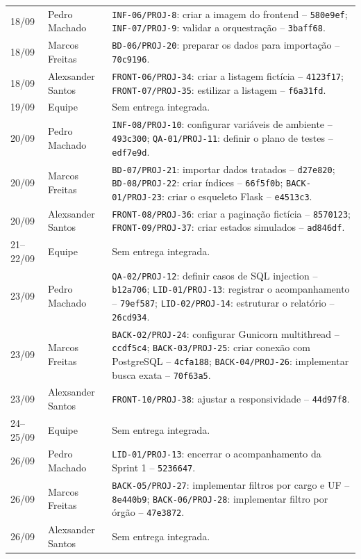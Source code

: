 \documentclass[12pt]{article}
\newcommand{\code}[1]{\texttt{#1}}
\begin{document}
\begin{longtable}{P{1.35cm}P{3.8cm}P{9.15cm}}
18/09 & Pedro Machado & \code{INF-06/PROJ-8}: criar a imagem do frontend -- \code{580e9ef}; \code{INF-07/PROJ-9}: validar a orquestração -- \code{3baff68}. \\
18/09 & Marcos Freitas & \code{BD-06/PROJ-20}: preparar os dados para importação -- \code{70c9196}. \\
18/09 & Alexsander Santos & \code{FRONT-06/PROJ-34}: criar a listagem fictícia -- \code{4123f17}; \code{FRONT-07/PROJ-35}: estilizar a listagem -- \code{f6a31fd}. \\
19/09 & Equipe & Sem entrega integrada. \\
20/09 & Pedro Machado & \code{INF-08/PROJ-10}: configurar variáveis de ambiente -- \code{493c300}; \code{QA-01/PROJ-11}: definir o plano de testes -- \code{edf7e9d}. \\
20/09 & Marcos Freitas & \code{BD-07/PROJ-21}: importar dados tratados -- \code{d27e820}; \code{BD-08/PROJ-22}: criar índices -- \code{66f5f0b}; \code{BACK-01/PROJ-23}: criar o esqueleto Flask -- \code{e4513c3}. \\
20/09 & Alexsander Santos & \code{FRONT-08/PROJ-36}: criar a paginação fictícia -- \code{8570123}; \code{FRONT-09/PROJ-37}: criar estados simulados -- \code{ad846df}. \\
21--22/09 & Equipe & Sem entrega integrada. \\
23/09 & Pedro Machado & \code{QA-02/PROJ-12}: definir casos de SQL injection -- \code{b12a706}; \code{LID-01/PROJ-13}: registrar o acompanhamento -- \code{79ef587}; \code{LID-02/PROJ-14}: estruturar o relatório -- \code{26cd934}. \\
23/09 & Marcos Freitas & \code{BACK-02/PROJ-24}: configurar Gunicorn multithread -- \code{ccdf5c4}; \code{BACK-03/PROJ-25}: criar conexão com PostgreSQL -- \code{4cfa188}; \code{BACK-04/PROJ-26}: implementar busca exata -- \code{70f63a5}. \\
23/09 & Alexsander Santos & \code{FRONT-10/PROJ-38}: ajustar a responsividade -- \code{44d97f8}. \\
24--25/09 & Equipe & Sem entrega integrada. \\
26/09 & Pedro Machado & \code{LID-01/PROJ-13}: encerrar o acompanhamento da Sprint 1 -- \code{5236647}. \\
26/09 & Marcos Freitas & \code{BACK-05/PROJ-27}: implementar filtros por cargo e UF -- \code{8e440b9}; \code{BACK-06/PROJ-28}: implementar filtro por órgão -- \code{47e3872}. \\
26/09 & Alexsander Santos & Sem entrega integrada. \\
\bottomrule
\end{longtable}
\normalsize
\end{document}
